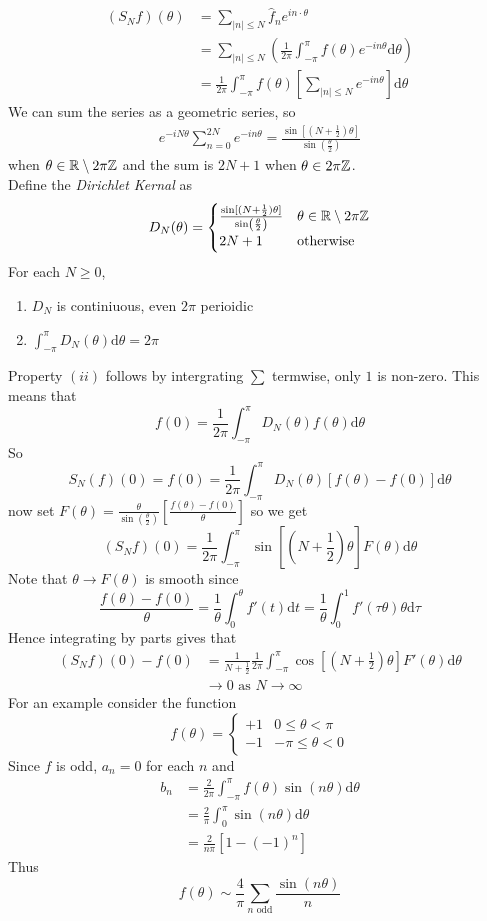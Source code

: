 \documentclass{article}
\begin{document}
\begin{align*}
	(S_Nf)(\theta)&=\sum_{|n|\le N}\hat f_ne^{in\cdot \theta} \\
		      &= \sum_{|n|\le N}\left(\frac{1}{2\pi}\int_{-\pi}^\pi f(\theta)e^{-in\theta}\mathrm d\theta\right)\\
		 &= \frac{1}{2\pi}\int_{-\pi}^\pi f(\theta)\left[\sum_{|n|\le N}e^{-in\theta}\right]\mathrm d\theta
\end{align*}
We can sum the series as a geometric series, so
\begin{align*}
	e^{-iN\theta}\sum_{n=0}^{2N}e^{-in\theta}=\frac{\sin[(N+\frac 12)\theta]}{\sin(\frac{\theta}{2})}
\end{align*}
when $ \theta\in \mathbb{R}\setminus2\pi\mathbb{Z} $ and the sum is $ 2N+1 $ when $ \theta\in2\pi\mathbb{Z} $.\\
Define the \textit{Dirichlet Kernal} as
\[
  D_N(\theta)=\begin{cases}
	  \frac{\sin[(N+\frac 12)\theta]}{\sin(\frac\theta 2)} & \theta\in \mathbb{R}\setminus 2\pi \mathbb{Z} \\
	  2N+1 & \text{otherwise}
  \end{cases}
\]
For each $ N\ge 0 $,
\begin{enumerate}
	\item $ D_N $ is continiuous, even $ 2\pi $ perioidic
	\item $ \int_{-\pi}^\pi D_N(\theta)\mathrm d\theta=2\pi $
\end{enumerate}
Property $ (ii) $ follows by intergrating $ \sum $ termwise, only $ 1 $ is non-zero. This means that
\[
	f(0)=\frac 1{2\pi}\int_{-\pi}^\pi D_N(\theta)f(\theta)\mathrm d\theta
\]
So
\[
	S_N(f)(0)=f(0)=\frac 1{2\pi}\int_{-\pi}^\pi D_N(\theta)[f(\theta)-f(0)]\mathrm d\theta
\]
now set $ F(\theta)=\frac{\theta}{\sin(\frac \theta 2)}\left[\frac{f(\theta)-f(0)}\theta\right] $
	so we get 
	\[
		(S_Nf)(0)=\frac 1{2\pi}\int_{-\pi}^\pi \sin[(N+\frac 12)\theta]F(\theta)\mathrm d\theta
	\]
	Note that $ \theta\to F(\theta) $ is smooth since
	\[
		\frac{f(\theta)-f(0)}{\theta}=\frac 1\theta\int_0^\theta f'(t)\mathrm dt=\frac 1\theta \int_0^1 f'(\tau\theta)\theta\mathrm d\tau
	\]
	Hence integrating by parts gives that
\begin{align*}
	(S_Nf)(0)-f(0)&=\frac{1}{N+\frac 12}\frac{1}{2\pi}\int_{-\pi}^\pi \cos[(N+\frac 12)\theta]F'(\theta)\mathrm d\theta \\
	&\to 0 \text{ as } N\to \infty
\end{align*}
For an example consider the function
\[
  f(\theta)=\begin{cases}
	  +1 & 0\le \theta < \pi \\
	  -1 & -\pi \le \theta < 0
  \end{cases}
\]
Since $ f $ is odd, $ a_n=0 $ for each $ n $ and
\begin{align*}
	b_n&=\frac{2}{2\pi}\int_{-\pi}^\pi f(\theta)\sin(n\theta)\mathrm d\theta \\
	   &= \frac 2\pi \int_0^\pi \sin(n\theta)\mathrm d\theta\\
	   &= \frac 2{n\pi}[1-(-1)^n]
\end{align*}
Thus
\[
	f(\theta)\sim \frac 4\pi \sum_{n \text{ odd}} \frac{\sin(n\theta)}n
\]
\end{document}
